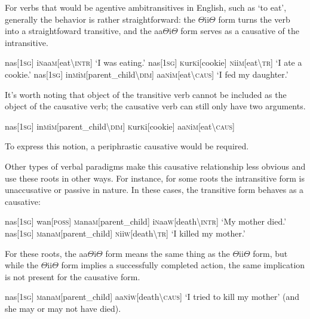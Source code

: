\documentclass[a4paper,10pt,twoside,openright]{memoir}
\newcommand{\rootpart}{$\Theta$}
\newcommand{\famwordold}[5]{#1\textsc{#2}#3\textsc{#4}#5}
\begin{document}
For verbs that would be agentive ambitransitives in English, such as `to eat', generally the behavior is rather straightforward: the {\rootpart}ii{\rootpart} form turns the verb into a straightfoward transitive, and the aa{\rootpart}i{\rootpart} form serves as a causative of the intransitive. 

\pex
\a
\begingl
nas[\textsc{1sg}]
\famwordold{i}{n}{aa}{m}{}[eat\textbackslash\textsc{intr}]
\glft `I was eating.'
\endgl
\a
\begingl
nas[\textsc{1sg}]
\famwordold{}{k}{ur}{k}{i}[cookie]
\famwordold{}{n}{ii}{m}{}[eat\textbackslash\textsc{tr}]
\glft `I ate a cookie.'
\endgl
\a
\begingl
nas[\textsc{1sg}]
\famwordold{in}{m}{i}{m}{}[parent\_child\textbackslash\textsc{dim}]
\famwordold{aa}{n}{i}{m}{}[eat\textbackslash\textsc{caus}]
\glft `I fed my daughter.'
\endgl
\xe

It's worth noting that object of the transitive verb cannot be included as the object of the causative verb; the causative verb can still only have two arguments.

\ex
\ljudge{*}
\begingl
nas[\textsc{1sg}]
\famwordold{in}{m}{i}{m}{}[parent\_child\textbackslash\textsc{dim}]
\famwordold{}{k}{ur}{k}{i}[cookie]
\famwordold{aa}{n}{i}{m}{}[eat\textbackslash\textsc{caus}]
\endgl
\xe

\noindent To express this notion, a periphrastic causative would be required.

Other types of verbal paradigms make this causative relationship less obvious and use these roots in other ways. For instance, for some roots the intransitive form is unaccusative or passive in nature. In these cases, the transitive form behaves as a causative:

\pex
\a
\begingl
nas[\textsc{1sg}]
wan[\textsc{poss}]
\famwordold{}{m}{ana}{m}{}[parent\_child]
\famwordold{i}{n}{aa}{w}{}[death\textbackslash\textsc{intr}]
\glft `My mother died.'
\endgl
\a
\begingl
nas[\textsc{1sg}]
\famwordold{}{m}{ana}{m}{}[parent\_child]
\famwordold{}{n}{ii}{w}{}[death\textbackslash\textsc{tr}]
\glft `I killed my mother.'
\endgl
\xe

For these roots, the aa{\rootpart}i{\rootpart} form means the same thing as the {\rootpart}ii{\rootpart} form, but while the {\rootpart}ii{\rootpart} form implies a successfully completed action, the same implication is not present for the causative form.

\ex
\begingl
nas[\textsc{1sg}]
\famwordold{}{m}{ana}{m}{}[parent\_child]
\famwordold{aa}{n}{i}{w}{}[death\textbackslash\textsc{caus}]
\glft `I tried to kill my mother' (and she may or may not have died).
\endgl
\xe
\end{document}
